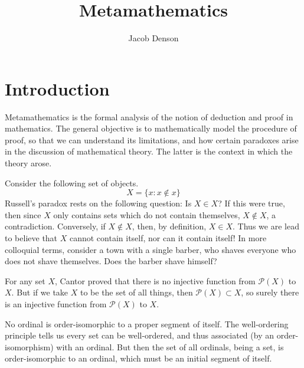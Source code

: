 

\title{Metamathematics}
\author{Jacob Denson}



\maketitle
\tableofcontents

\chapter{Introduction}


Metamathematics is the formal analysis of the notion of deduction and proof in mathematics. The general objective is to mathematically model the procedure of proof, so that we can understand its limitations, and how certain paradoxes arise in the discussion of mathematical theory. The latter is the context in which the theory arose.

\begin{example}[Russell]
    Consider the following set of objects.
    \[ X = \{ x: x \not \in x \} \]
    Russell's paradox rests on the following question: Is $X \in X$? If this were true, then since $X$ only contains sets which do not contain themselves, $X \not \in X$, a contradiction. Conversely, if $X \not \in X$, then, by definition, $X \in X$. Thus we are lead to believe that $X$ cannot contain itself, nor can it contain itself! In more colloquial terms, consider a town with a single barber, who shaves everyone who does not shave themselves. Does the barber shave himself?
\end{example}

\begin{example}[Cantor]
    For any set $X$, Cantor proved that there is no injective function from $\mathcal{P}(X)$ to $X$. But if we take $X$ to be the set of all things, then $\mathcal{P}(X) \subset X$, so surely there is an injective function from $\mathcal{P}(X)$ to $X$.
\end{example}

\begin{example}
    No ordinal is order-isomorphic to a proper segment of itself. The well-ordering principle tells us every set can be well-ordered, and thus associated (by an order-isomorphism) with an ordinal. But then the set of all ordinals, being a set, is order-isomorphic to an ordinal, which must be an initial segment of itself.
\end{example}

